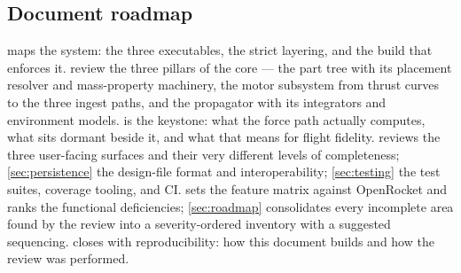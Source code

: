 \subsection{Document roadmap}

 maps the system: the three executables, the strict layering, and the
build that enforces it.  review the three pillars of
the core --- the part tree with its placement resolver and mass-property machinery, the
motor subsystem from thrust curves to the three ingest paths, and the propagator with its
integrators and environment models.  is the keystone: what the force path
actually computes, what sits dormant beside it, and what that means for flight fidelity.
 reviews the three user-facing surfaces and their very different
levels of completeness; \cref{sec:persistence} the design-file format and
interoperability; \cref{sec:testing} the test suites, coverage tooling, and CI.
 sets the feature matrix against OpenRocket and ranks the
functional deficiencies; \cref{sec:roadmap} consolidates every incomplete area found by
the review into a severity-ordered inventory with a suggested sequencing. 
closes with reproducibility: how this document builds and how the review was performed.
